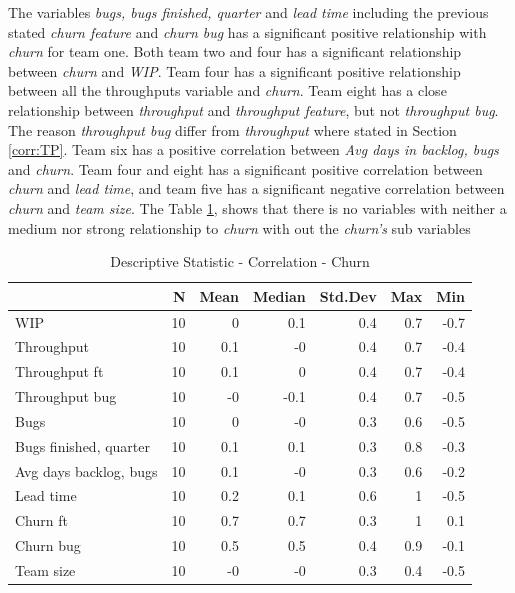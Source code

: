 \documentclass[UKenglish]{ifimaster}  %
\begin{document}
The variables \textit{bugs, bugs finished, quarter} and \textit{lead time} including the previous stated \textit{churn feature} and \textit{churn bug} has a significant positive relationship with \textit{churn} for team one. Both team two and four has a significant relationship between \textit{churn} and \textit{WIP}. Team four has a significant positive relationship between all the throughputs variable and \textit{churn}. Team eight has a close relationship between \textit{throughput} and \textit{throughput feature}, but not \textit{throughput bug}. The reason \textit{throughput bug} differ from \textit{throughput} where stated in Section \ref{corr:TP}. Team six has a positive correlation between \textit{Avg days in backlog, bugs} and \textit{churn}. Team four and eight has a significant positive correlation between \textit{churn} and \textit{lead time}, and team five has a significant negative correlation between \textit{churn} and \textit{team size}. The Table \ref{DS:corr:Churn}, shows that there is no variables with neither a medium nor strong relationship to \textit{churn} with out the \textit{churn's} sub variables 

\begin{table}[!htbp]
 \centering
 \begin{tabular}{ | l | r | r | r | r | r | r | }
 \hline
& \bf{N} & \bf{Mean} & \bf{Median} & \bf{Std.Dev} & \bf{Max} & \bf{Min} \\ \hline
WIP  & 10 & 0 & 0.1 & 0.4 & 0.7 & -0.7\\ \hline
Throughput  & 10 & 0.1 & -0 & 0.4 & 0.7 & -0.4\\ \hline
Throughput ft  & 10 & 0.1 & 0 & 0.4 & 0.7 & -0.4\\ \hline
Throughput bug  & 10 & -0 & -0.1 & 0.4 & 0.7 & -0.5\\ \hline
Bugs  & 10 & 0 & -0 & 0.3 & 0.6 & -0.5\\ \hline
Bugs finished, quarter  & 10 & 0.1 & 0.1 & 0.3 & 0.8 & -0.3\\ \hline
Avg days backlog, bugs  & 10 & 0.1 & -0 & 0.3 & 0.6 & -0.2\\ \hline
Lead time & 10 & 0.2 & 0.1 & 0.6 & 1 & -0.5\\ \hline
Churn ft  & 10 & 0.7 & 0.7 & 0.3 & 1 & 0.1\\ \hline
Churn bug  & 10 & 0.5 & 0.5 & 0.4 & 0.9 & -0.1\\ \hline
Team size  & 10 & -0 & -0 & 0.3 & 0.4 & -0.5\\ \hline
\end{tabular}
 \caption{Descriptive Statistic - Correlation - Churn}
 \label{DS:corr:Churn}
 \end{table}
 
\end{document}
